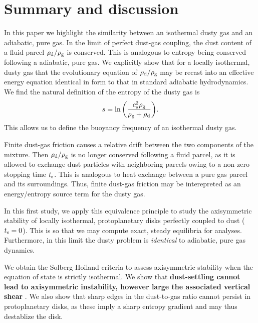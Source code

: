 \section{Summary and discussion}
In this paper we highlight the similarity between an isothermal 
dusty gas and an adiabatic, pure gas. 
In the limit of perfect dust-gas coupling, the dust content of a fluid 
parcel $\rho_\mathrm{d}/\rho_\mathrm{g}$ is conserved. This is analogous to entropy being 
conserved following a adiabatic, pure gas. %
We explicitly show that for 
a locally isothermal, dusty gas that the evolutionary equation of 
$\rho_\mathrm{d}/\rho_\mathrm{g}$ may be recast into an effective energy equation identical
in form to that in standard adiabatic hydrodynamics. We find the 
natural definition of the entropy of the dusty gas is 
\begin{align*}
  s  = \ln{\left(\frac{c_s^2\rho_\mathrm{g}}{\rho_\mathrm{g}+\rho_\mathrm{d}}\right)}.  
\end{align*}
This allows us to define the buoyancy frequency of an isothermal 
dusty gas. 

%

Finite dust-gas friction causes a relative drift between the two
components of the mixture. Then $\rho_\mathrm{d}/\rho_\mathrm{g} $ is no
longer conserved following a fluid parcel, as it is allowed to
exchange dust particles with neighboring parcels owing to a non-zero
stopping time $t_\mathrm{s}$. This is analogous to heat exchange between a 
pure gas parcel and its surroundings. Thus, finite dust-gas friction
may be interepreted as an energy/entropy source term for the dusty
gas.   

%
In this first study, we apply this equivalence principle to study the
axisymmetric stability of locally isothermal, protoplanetary disks
perfectly coupled to dust ($t_\mathrm{s}=0$). This is so that we may 
compute exact, steady equilibria for analyses. Furthermore,
in this limit the dusty problem is \emph{identical} to adiabatic, pure
gas dynamics. 

We obtain the Solberg-Hoiland criteria to assess
axisymmetric stability when the equation of state is strictly
isothermal. We show that {\bf dust-settling cannot lead to
  axisymmetric instability, however large the associated vertical
  shear} \citep[cf. \emph{non-axisymmetric} Kelvin-Helmholtz instabilities
  induced by  dust-settling, ][]{lee10}. We also show that
sharp edges in the dust-to-gas ratio cannot persist in protoplanetary
disks, as these imply a sharp entropy gradient and may thus destablize
the disk. 

